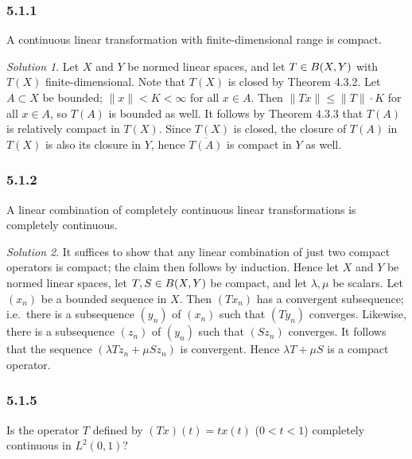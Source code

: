 \documentclass{report}
\newcommand{\norm}[1]{{\lVert #1 \rVert}}
\let\sc\relax
\newcommand{\sc}[1]{\mathscr{#1}}
\theoremstyle{remark}
\newtheorem*{solution}{Solution}
\begin{document}
\subsubsection*{5.1.1}
A continuous linear transformation with finite-dimensional range is compact.

\begin{solution}
  Let $X$ and $Y$ be normed linear spaces, and let $T \in \sc B(X,Y)$ with $T(X)$ finite-dimensional. Note that $T(X)$ is closed by Theorem 4.3.2. Let $A \subset X$ be bounded; $\norm x < K < \infty$ for all $x \in A$. Then $\norm{Tx} \le \norm T \cdot K$ for all $x \in A$, so $T(A)$ is bounded as well. It follows by Theorem 4.3.3 that $T(A)$ is relatively compact in $T(X)$. Since $T(X)$ is closed, the closure of $T(A)$ in $T(X)$ is also its closure in $Y$, hence $\overline{T(A)}$ is compact in $Y$ as well.
\end{solution}

\subsubsection*{5.1.2}
A linear combination of completely continuous linear transformations is completely continuous.

\begin{solution}
  It suffices to show that any linear combination of just two compact operators is compact; the claim then follows by induction. Hence let $X$ and $Y$ be normed linear spaces, let $T, S \in \sc B(X,Y)$ be compact, and let $\lambda, \mu$ be scalars. Let $(x_n)$ be a bounded sequence in $X$. Then $(Tx_n)$ has a convergent subsequence; i.e.\ there is a subsequence $(y_n)$ of $(x_n)$ such that $(Ty_n)$ converges. Likewise, there is a subsequence $(z_n)$ of $(y_n)$ such that $(Sz_n)$ converges. It follows that the sequence $(\lambda Tz_n + \mu Sz_n)$ is convergent. Hence $\lambda T + \mu S$ is a compact operator.
\end{solution}

\subsubsection*{5.1.5}
Is the operator $T$ defined by $(Tx)(t) = tx(t)$ ($0 < t < 1$) completely continuous in $L^2(0,1)$?
\end{document}
